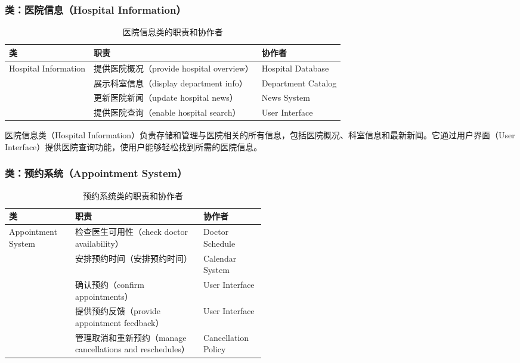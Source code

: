\subsubsection{类：医院信息（Hospital Information）}
\begin{table}[htbp]
	\centering
	\begin{tabular}{|l|l|l|}
		\hline
		\textbf{类} & \textbf{职责} & \textbf{协作者} \\
		\hline
		Hospital Information & 提供医院概况（provide hospital overview） & Hospital Database \\
		& 展示科室信息（display department info） & Department Catalog \\
		& 更新医院新闻（update hospital news） & News System \\
		& 提供医院查询（enable hospital search） & User Interface \\
		\hline
	\end{tabular}
	\caption{医院信息类的职责和协作者}
	\label{tab:hospital_information}
\end{table}

医院信息类（Hospital Information）负责存储和管理与医院相关的所有信息，包括医院概况、科室信息和最新新闻。它通过用户界面（User Interface）提供医院查询功能，使用户能够轻松找到所需的医院信息。

\subsubsection{类：预约系统（Appointment System）}
\begin{table}[htbp]
	\centering
	\begin{tabular}{|l|p{0.5\linewidth}|l|}
		\hline
		\textbf{类} & \textbf{职责} & \textbf{协作者} \\
		\hline
		Appointment System & 检查医生可用性（check doctor availability） & Doctor Schedule \\
		& 安排预约时间（安排预约时间） & Calendar System \\
		& 确认预约（confirm appointments） & User Interface \\
		& 提供预约反馈（provide appointment feedback） & User Interface \\
		& 管理取消和重新预约（manage cancellations and reschedules） & Cancellation Policy \\
		\hline
	\end{tabular}
	\caption{预约系统类的职责和协作者}
	\label{tab:appointment_system}
\end{table}

